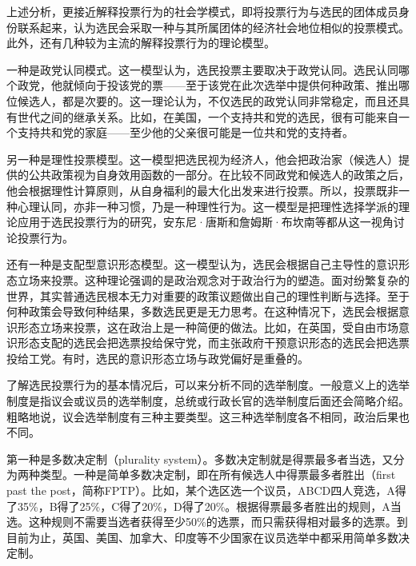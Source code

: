 上述分析，更接近解释投票行为的社会学模式，即将投票行为与选民的团体成员身份联系起来，认为选民会采取一种与其所属团体的经济社会地位相似的投票模式。此外，还有几种较为主流的解释投票行为的理论模型。

一种是政党认同模式。这一模型认为，选民投票主要取决于政党认同。选民认同哪个政党，他就倾向于投该党的票——至于该党在此次选举中提供何种政策、推出哪位候选人，都是次要的。这一理论认为，不仅选民的政党认同非常稳定，而且还具有世代之间的继承关系。比如，在美国，一个支持共和党的选民，很有可能来自一个支持共和党的家庭——至少他的父亲很可能是一位共和党的支持者。

另一种是理性投票模型。这一模型把选民视为经济人，他会把政治家（候选人）提供的公共政策视为自身效用函数的一部分。在比较不同政党和候选人的政策之后，他会根据理性计算原则，从自身福利的最大化出发来进行投票。所以，投票既非一种心理认同，亦非一种习惯，乃是一种理性行为。这一模型是把理性选择学派的理论应用于选民投票行为的研究，安东尼·唐斯和詹姆斯·布坎南等都从这一视角讨论投票行为。

还有一种是支配型意识形态模型。这一模型认为，选民会根据自己主导性的意识形态立场来投票。这种理论强调的是政治观念对于政治行为的塑造。面对纷繁复杂的世界，其实普通选民根本无力对重要的政策议题做出自己的理性判断与选择。至于何种政策会导致何种结果，多数选民更是无力思考。在这种情况下，选民会根据意识形态立场来投票，这在政治上是一种简便的做法。比如，在英国，受自由市场意识形态支配的选民会把选票投给保守党，而主张政府干预意识形态的选民会把选票投给工党。有时，选民的意识形态立场与政党偏好是重叠的。


了解选民投票行为的基本情况后，可以来分析不同的选举制度。一般意义上的选举制度是指议会或议员的选举制度，总统或行政长官的选举制度后面还会简略介绍。粗略地说，议会选举制度有三种主要类型。这三种选举制度各不相同，政治后果也不同。

第一种是多数决定制（plurality system）。多数决定制就是得票最多者当选，又分为两种类型。一种是简单多数决定制，即在所有候选人中得票最多者胜出（first past the post，简称FPTP）。比如，某个选区选一个议员，ABCD四人竞选，A得了35\%，B得了25\%，C得了20\%，D得了20\%。根据得票最多者胜出的规则，A当选。这种规则不需要当选者获得至少50\%的选票，而只需获得相对最多的选票。到目前为止，英国、美国、加拿大、印度等不少国家在议员选举中都采用简单多数决定制。

